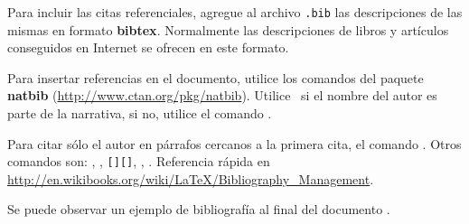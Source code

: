 
Para incluir las citas referenciales, agregue al archivo \texttt{.bib} las descripciones de las mismas en formato \textbf{bibtex}. Normalmente las descripciones de libros y artículos conseguidos en Internet se ofrecen en este formato.

Para insertar referencias en el documento, utilice los comandos del paquete \textbf{natbib} (\url{http://www.ctan.org/pkg/natbib}). Utilice \pa\ si el nombre del autor es parte de la narrativa, si no, utilice el comando \pa.

Para citar sólo el autor en párrafos cercanos a la primera cita, el comando \pa. Otros comandos son: , , \texttt{[][]}, , . Referencia rápida en \url{http://en.wikibooks.org/wiki/LaTeX/Bibliography_Management}.

Se puede observar un ejemplo de bibliografía al final del documento \citep{wikibib}.



